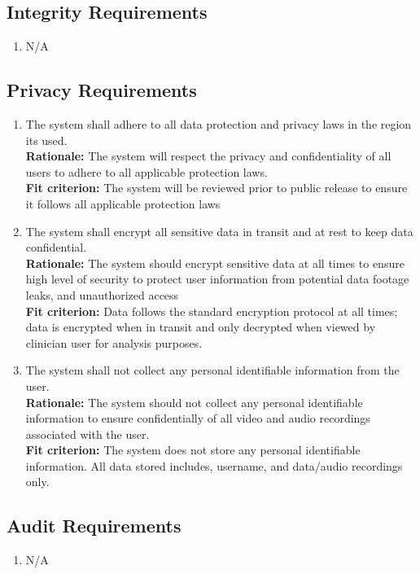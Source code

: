 \documentclass[12pt]{article}
\begin{document}
\subsection{Integrity Requirements}
\begin{enumerate}[label={SR-INT\arabic*}. ]
  \item N/A
\end{enumerate}
\subsection{Privacy Requirements}
\begin{enumerate}[label={SR-P\arabic*.} ]
  \item The system shall adhere to all data protection and privacy laws in the region its used.\\
  \textbf{Rationale: }The system will respect the privacy and confidentiality of all users to adhere to all applicable protection laws.\\
  \textbf{Fit criterion: }The system will be reviewed prior to public release to ensure it follows all applicable protection laws
  \item The system shall encrypt all sensitive data in transit and at rest to keep data confidential.\\
  \textbf{Rationale: }The system should encrypt sensitive data at all times to ensure high level of security to protect user information from potential data footage leaks, and unauthorized access \\
  \textbf{Fit criterion: }Data follows the standard encryption protocol at all times; data is encrypted when in transit and only decrypted when viewed by clinician user for analysis purposes.
  \item The system shall not collect any personal identifiable information from the user.\\
  \textbf{Rationale: }The system should not collect any personal identifiable information to ensure confidentially of all video and audio recordings associated with the user. \\
  \textbf{Fit criterion: }The system does not store any personal identifiable information. All data stored includes, username, and data/audio recordings only. 
\end{enumerate}
\subsection{Audit Requirements}
\begin{enumerate}[label={SR-AU}1. ]
  \item N/A
\end{enumerate}
\end{document}
